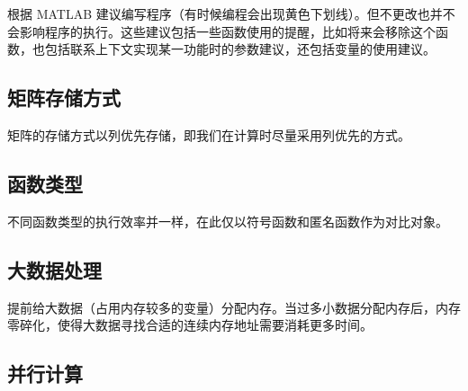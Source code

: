 根据 MATLAB 建议编写程序（有时候编程会出现黄色下划线）。但不更改也并不会影响程序的执行。这些建议包括一些函数使用的提醒，比如将来会移除这个函数，也包括联系上下文实现某一功能时的参数建议，还包括变量的使用建议。





\subsection{矩阵存储方式}

矩阵的存储方式以列优先存储，即我们在计算时尽量采用列优先的方式。

\vspace{-0.8cm}


\vspace{-0.8cm}






\subsection{函数类型}

不同函数类型的执行效率并一样，在此仅以符号函数和匿名函数作为对比对象。

\vspace{-0.8cm}


\vspace{-0.8cm}






\subsection{大数据处理}

提前给大数据（占用内存较多的变量）分配内存。当过多小数据分配内存后，内存零碎化，使得大数据寻找合适的连续内存地址需要消耗更多时间。





\subsection{并行计算}


